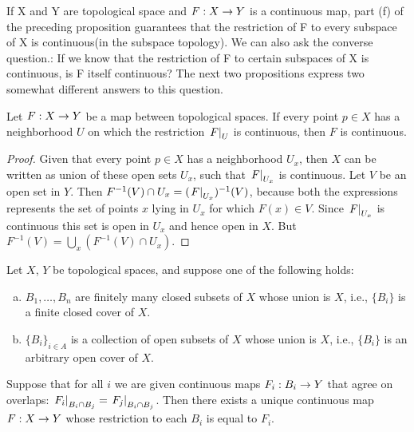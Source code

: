 \documentclass[11pt,a4paper]{article}
\begin{document}
If X and Y are topological space and $F:X\rightarrow Y$ is a continuous map, part (f) of the preceding proposition guarantees that the restriction of F to every subspace of X is continuous(in the subspace topology). We can also ask the converse question.: If we know that the restriction of F to certain subspaces of X is continuous, is F itself continuous? The next two propositions express two somewhat different answers to this question.

\begin{proposition}
Let $F:X\rightarrow Y$ be a map between topological spaces. If every point $p\in X$ has a neighborhood $U$ on which the restriction $\left.F\right|_{U}$ is continuous, then $F$ is continuous.
\end{proposition}

\begin{proof}
Given that every point $p\in X$ has a neighborhood $U_x$, then $X$ can be written as union of these open sets $U_x$, such that $\left.F\right|_{U_x}$ is continuous. Let $V$ be an open set in $Y$. Then $F^{-1}(V)\cap U_x = (\left.F\right|_{U_x})^{-1}(V)$, because both the expressions represents the set of points $x$ lying in $U_x$ for which $F(x)\in V$. Since $\left.F\right|_{U_x}$ is continuous this set is open in $U_x$ and hence open in $X$. But $F^{-1}(V) = \bigcup_x (F^{-1}(V)\cap U_x)$.
\end{proof}

\begin{proposition} \label{prop:gluing_lemma}
Let $X$, $Y$ be topological spaces, and suppose one of the following holds:
\begin{enumerate}[(a)]
    \item $B_1,\ldots,B_n$ are finitely many closed subsets of $X$ whose union is $X$, i.e., $\{B_i\}$ is a finite closed cover of $X$.
    \item $\{B_i\}_{i\in A}$ is a collection of open subsets of $X$ whose union is $X$, i.e., $\{B_i\}$ is an arbitrary open cover of $X$.
\end{enumerate}
Suppose that for all $i$ we are given continuous maps $F_i:B_i\rightarrow Y$ that agree on overlaps: $\left.F_i\right|_{B_i\cap B_j} = \left.F_j\right|_{B_i\cap B_j}$. Then there exists a unique continuous map $F:X\rightarrow Y$ whose restriction to each $B_i$ is equal to $F_i$.
\end{proposition}
\end{document}
